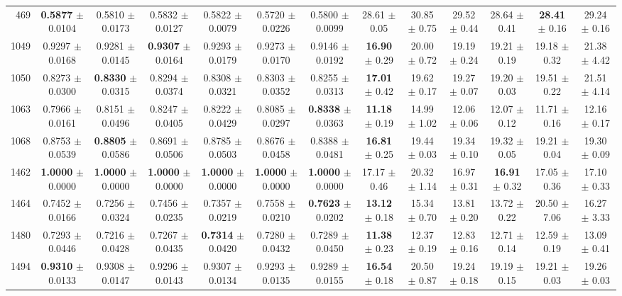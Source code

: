 \begin{table}[t]
{\begin{tabular}{@{}rcccccc@{\hspace{7pt}}cccccc@{}}
469 & \textbf{0.5877} $\pm$ 0.0104 & 0.5810 $\pm$ 0.0173 & 0.5832 $\pm$ 0.0127 & 0.5822 $\pm$ 0.0079 & 0.5720 $\pm$ 0.0226 & 0.5800 $\pm$ 0.0099 & 28.61 $\pm$ 0.05 & 30.85 $\pm$ 0.75 & 29.52 $\pm$ 0.44 & 28.64 $\pm$ 0.41 & \textbf{28.41} $\pm$ 0.16 & 29.24 $\pm$ 0.16 \\
1049 & 0.9297 $\pm$ 0.0168 & 0.9281 $\pm$ 0.0145 & \textbf{0.9307} $\pm$ 0.0164 & 0.9293 $\pm$ 0.0179 & 0.9273 $\pm$ 0.0170 & 0.9146 $\pm$ 0.0192 & \textbf{16.90} $\pm$ 0.29 & 20.00 $\pm$ 0.72 & 19.19 $\pm$ 0.24 & 19.21 $\pm$ 0.19 & 19.18 $\pm$ 0.32 & 21.38 $\pm$ 4.42 \\
1050 & 0.8273 $\pm$ 0.0300 & \textbf{0.8330} $\pm$ 0.0315 & 0.8294 $\pm$ 0.0374 & 0.8308 $\pm$ 0.0321 & 0.8303 $\pm$ 0.0352 & 0.8255 $\pm$ 0.0313 & \textbf{17.01} $\pm$ 0.42 & 19.62 $\pm$ 0.17 & 19.27 $\pm$ 0.07 & 19.20 $\pm$ 0.03 & 19.51 $\pm$ 0.22 & 21.51 $\pm$ 4.14 \\
1063 & 0.7966 $\pm$ 0.0161 & 0.8151 $\pm$ 0.0496 & 0.8247 $\pm$ 0.0405 & 0.8222 $\pm$ 0.0429 & 0.8085 $\pm$ 0.0297 & \textbf{0.8338} $\pm$ 0.0363 & \textbf{11.18} $\pm$ 0.19 & 14.99 $\pm$ 1.02 & 12.06 $\pm$ 0.06 & 12.07 $\pm$ 0.12 & 11.71 $\pm$ 0.16 & 12.16 $\pm$ 0.17 \\
1068 & 0.8753 $\pm$ 0.0539 & \textbf{0.8805} $\pm$ 0.0586 & 0.8691 $\pm$ 0.0506 & 0.8785 $\pm$ 0.0503 & 0.8676 $\pm$ 0.0458 & 0.8388 $\pm$ 0.0481 & \textbf{16.81} $\pm$ 0.25 & 19.44 $\pm$ 0.03 & 19.34 $\pm$ 0.10 & 19.32 $\pm$ 0.05 & 19.21 $\pm$ 0.04 & 19.30 $\pm$ 0.09 \\
1462 & \textbf{1.0000} $\pm$ 0.0000 & \textbf{1.0000} $\pm$ 0.0000 & \textbf{1.0000} $\pm$ 0.0000 & \textbf{1.0000} $\pm$ 0.0000 & \textbf{1.0000} $\pm$ 0.0000 & \textbf{1.0000} $\pm$ 0.0000 & 17.17 $\pm$ 0.46 & 20.32 $\pm$ 1.14 & 16.97 $\pm$ 0.31 & \textbf{16.91} $\pm$ 0.32 & 17.05 $\pm$ 0.36 & 17.10 $\pm$ 0.33 \\
1464 & 0.7452 $\pm$ 0.0166 & 0.7256 $\pm$ 0.0324 & 0.7456 $\pm$ 0.0235 & 0.7357 $\pm$ 0.0219 & 0.7558 $\pm$ 0.0210 & \textbf{0.7623} $\pm$ 0.0202 & \textbf{13.12} $\pm$ 0.18 & 15.34 $\pm$ 0.70 & 13.81 $\pm$ 0.20 & 13.72 $\pm$ 0.22 & 20.50 $\pm$ 7.06 & 16.27 $\pm$ 3.33 \\
1480 & 0.7293 $\pm$ 0.0446 & 0.7216 $\pm$ 0.0428 & 0.7267 $\pm$ 0.0435 & \textbf{0.7314} $\pm$ 0.0420 & 0.7280 $\pm$ 0.0432 & 0.7289 $\pm$ 0.0450 & \textbf{11.38} $\pm$ 0.23 & 12.37 $\pm$ 0.19 & 12.83 $\pm$ 0.16 & 12.71 $\pm$ 0.14 & 12.59 $\pm$ 0.19 & 13.09 $\pm$ 0.41 \\
1494 & \textbf{0.9310} $\pm$ 0.0133 & 0.9308 $\pm$ 0.0147 & 0.9296 $\pm$ 0.0143 & 0.9307 $\pm$ 0.0134 & 0.9293 $\pm$ 0.0135 & 0.9289 $\pm$ 0.0155 & \textbf{16.54} $\pm$ 0.18 & 20.50 $\pm$ 0.87 & 19.24 $\pm$ 0.18 & 19.19 $\pm$ 0.15 & 19.21 $\pm$ 0.03 & 19.26 $\pm$ 0.03 \\

\end{tabular}}
\end{table}

